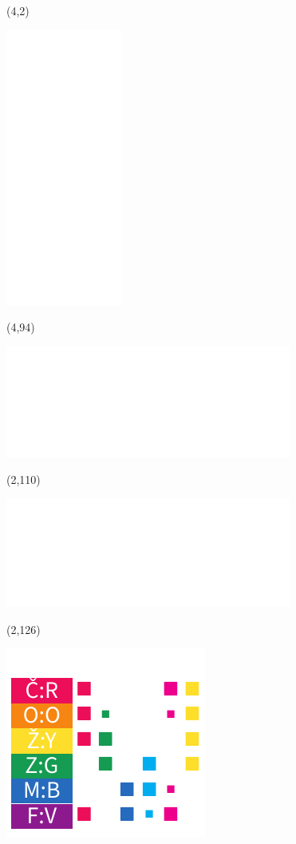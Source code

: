 \documentclass{extarticle}
\begin{document}
\pagecolor{black}
\pagestyle{empty}

\begin{textblock}{38}(4,2)
\vfill
{\centerline{\includegraphics[width=38mm]{tools/numbers-table-v3.pdf}}} 
\vfill
\end{textblock}


\begin{textblock}{38}(4,94)
\vfill
{\centerline{\includegraphics[scale=0.6333]{tools/rosicrucian-polish-v2.pdf}}} 
\vfill
\end{textblock}

\begin{textblock}{38}(2,110)
\vfill
{\centerline{\includegraphics[scale=0.6333]{tools/keyboard-v2.pdf}}} 
\vfill
\end{textblock}

\begin{textblock}{26.6}(2,126)
\vfill
{\centerline{\includegraphics[scale=0.6333]{tools/rainbow-v2.pdf}}} 
\vfill
\end{textblock}
\end{document}

